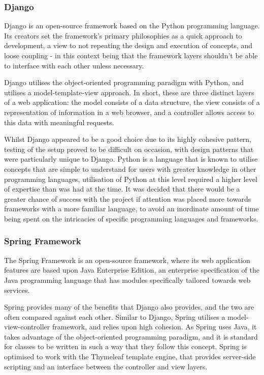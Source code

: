 \subsubsection{Django}

Django is an open-source framework based on the Python programming language. Its creators set the framework's primary philosophies as a quick approach to development, a view to not repeating the design and execution of concepts, and loose coupling - in this context being that the framework layers shouldn't be able to interface with each other unless necessary\cite{DjangoPhilo}.

Django utilises the object-oriented programming paradigm with Python, and utilises a model-template-view approach. In short, these are three distinct layers of a web application: the model consists of a data structure, the view consists of a representation of information in a web browser, and a controller allows access to this data with meaningful requests\cite{LeffA2001Wdut}.

Whilst Django appeared to be a good choice due to its highly cohesive pattern, testing of the setup proved to be difficult on occasion, with design patterns that were particularly unique to Django. Python is a language that is known to utilise concepts that are simple to understand for users with greater knowledge in other programming languages, utilisation of Python at this level required a higher level of expertise than was had at the time. It was decided that there would be a greater chance of success with the project if attention was placed more towards frameworks with a more familiar language, to avoid an inordinate amount of time being spent on the intricacies of specific programming languages and frameworks.
 
\subsubsection{Spring Framework}

The Spring Framework is an open-source framework, where its web application features are based upon Java Enterprise Edition, an enterprise specification of the Java programming language that has modules specifically tailored towards web services\cite{JavaEE}.

Spring provides many of the benefits that Django also provides, and the two are often compared against each other. Similar to Django, Spring utilises a model-view-controller framework, and relies upon high cohesion. As Spring uses Java, it takes advantage of the object-oriented programming paradigm, and it is standard for classes to be written in such a way that they follow this concept. Spring is optimised to work with the Thymeleaf template engine, that provides server-side scripting and an interface between the controller and view layers\cite{Thymeleaf}.

